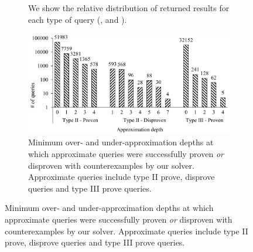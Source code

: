 \begin{figure}
\begin{subfigure}[b]{0.43\textwidth}
{We show the relative distribution of returned results for each type of query (,  and ).}
\end{subfigure}%
\hfill
\begin{subfigure}[b]{0.55\textwidth}
\begin{center}
\includegraphics[width=1.02\textwidth]{chapters/figures/figQueryDepthDist.png}
\end{center}
\caption{\label{tab:querydepthdist}Minimum over- and under-approximation depths at which approximate queries were successfully proven {\em or} disproven with counterexamples by our solver.
Approximate queries include type II prove, disprove queries and type III prove queries.}
\end{subfigure}
\end{figure}

